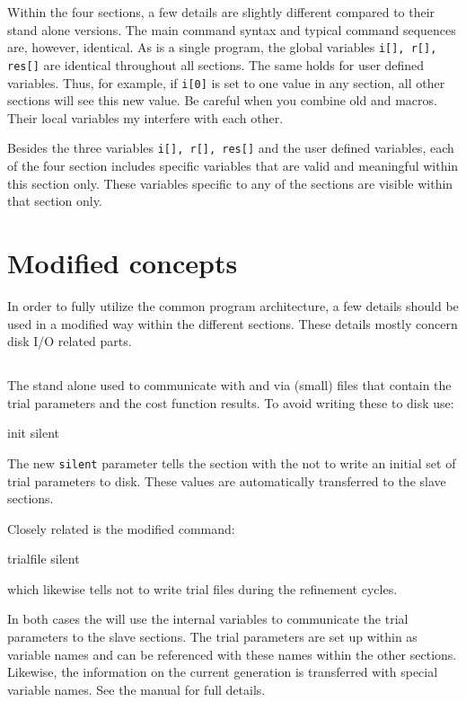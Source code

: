 Within the four sections, a few details are slightly different compared to 
their stand alone versions. The main command syntax and typical command 
sequences are, however, identical. As \Suite is a single program, the 
global variables {\tt i[], r[], res[]} are identical throughout all 
sections. The same holds for user defined variables. Thus, for example,
if {\tt i[0]} is set to one value in any section, all other sections will
see this new value. Be careful when you combine old \Discus and \Kuplot 
macros. Their local variables my interfere with each other. 

Besides the three variables {\tt i[], r[], res[]} and the user defined
variables, each of the four section includes specific variables that are
valid and meaningful within this section only. These variables 
specific to any of the sections are visible within that section only.

\section{Modified concepts}

In order to fully utilize the common program architecture, a few details
should be used in a modified way within the different sections. These details
mostly concern disk I/O related parts. 


\subsection{\diffev}

The stand alone \Diffev used to communicate with \Discus and \Kuplot via (small) 
files that contain the trial parameters and the cost function results.
To avoid writing these to disk use:
\begin{MacVerbatim}
  init silent
\end{MacVerbatim}
The new {\tt silent} parameter tells the \Diffev section with the \Suite 
not to write an initial set of
trial parameters to disk. These values are automatically transferred to the 
slave sections.

Closely related is the modified command:
\begin{MacVerbatim}
  trialfile silent
\end{MacVerbatim}
which likewise tells \Diffev not to write trial files during the refinement
cycles.

In both cases the \Suite will use the internal variables 
to communicate the trial parameters to the slave sections. 
The trial parameters are set up within 
\href{./diffev\_man.pdf}\Diffev as variable names and can 
be referenced with these names within the other sections.
Likewise, the information on the current generation is transferred with 
special variable names. See the 
\href{./diffev\_man.pdf}{\Diffev}  
manual for full details.

